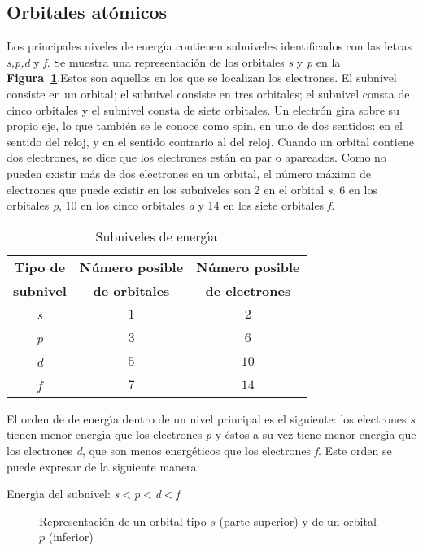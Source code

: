 \subsection{Orbitales at\'omicos}
Los principales niveles de energ\'{\i}a contienen subniveles identificados con
las letras \textit{s,p,d} y \textit{f}. Se muestra una representaci\'on de los orbitales \textit{s} y \textit{p} en la \textbf{Figura~\ref{fig3:1}}.Estos  
 son aquellos en los que se localizan los electrones. El subnivel
 consiste en un orbital; el subnivel
  consiste en tres orbitales; el subnivel
 consta de cinco orbitales y el subnivel
 consta de siete orbitales. Un electr\'on gira sobre su propio eje, lo que tambi\'en se le conoce como spin,  en uno de dos sentidos: en el sentido del reloj, y en el sentido contrario al del reloj. Cuando un or\-bital contiene dos electrones, se dice que los electrones est\'an en par o apareados. Como no pueden existir m\'as de dos electrones en un orbital, el n\'umero m\'aximo de electrones que puede existir en los subniveles son  2 en el orbital \textit{s}, 6 en los orbitales \textit{p}, 10 en los cinco orbitales \textit{d} y 14 en los siete orbitales \textit{f}.

\begin{table}[hbt]
\caption{Subniveles de energ\'{\i}a}
\label{tabla3.2}
\begin{center}
\begin{tabular}{ccc}\hline
\textbf{Tipo de} & \textbf{N\'umero posible}& \textbf{N\'umero posible}\\
\textbf{subnivel}& \textbf{de orbitales}  &\textbf{de electrones}\\\hline
\textit{s}&$1$&$2$\\
\textit{p}&$3$&$6$\\
\textit{d}&$5$&$10$\\
\textit{f}&$7$&$14$\\\hline
\end{tabular}
\end{center}
\end{table} 
El orden de de energ\'{\i}a dentro de un nivel principal es el si\-gui\-en\-te:  los electrones \textit{s} tienen menor energ\'{\i}a que los electrones \textit{p}
 y \'estos a su vez tiene menor energ\'{\i}a que los electrones \textit{d}, que son menos energ\'eticos que los electrones \textit{f}. Este orden se puede
expresar de la siguiente manera:
\begin{center}
Energ\'{\i}a del subnivel: \textit{s}$<$\textit{p}$<$\textit{d}$<$\textit{f}

\begin{figure}
\hspace{4cm}
\vglue 0.2in
\hspace{1.5cm}
\caption[Orbitales $s$ y$p$]{Representaci\'on de un orbital tipo $s$ (parte superior)
y de un orbital $p$ (inferior)}
\label{fig3:1}
\end{figure}
\end{center}


